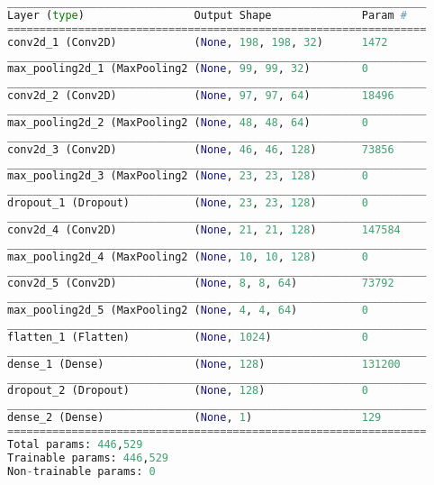 \begin{lstlisting}[language=Python, caption=Full result of the CNN model]
_________________________________________________________________
Layer (type)                 Output Shape              Param #   
=================================================================
conv2d_1 (Conv2D)            (None, 198, 198, 32)      1472      
_________________________________________________________________
max_pooling2d_1 (MaxPooling2 (None, 99, 99, 32)        0         
_________________________________________________________________
conv2d_2 (Conv2D)            (None, 97, 97, 64)        18496     
_________________________________________________________________
max_pooling2d_2 (MaxPooling2 (None, 48, 48, 64)        0         
_________________________________________________________________
conv2d_3 (Conv2D)            (None, 46, 46, 128)       73856     
_________________________________________________________________
max_pooling2d_3 (MaxPooling2 (None, 23, 23, 128)       0         
_________________________________________________________________
dropout_1 (Dropout)          (None, 23, 23, 128)       0         
_________________________________________________________________
conv2d_4 (Conv2D)            (None, 21, 21, 128)       147584    
_________________________________________________________________
max_pooling2d_4 (MaxPooling2 (None, 10, 10, 128)       0         
_________________________________________________________________
conv2d_5 (Conv2D)            (None, 8, 8, 64)          73792     
_________________________________________________________________
max_pooling2d_5 (MaxPooling2 (None, 4, 4, 64)          0         
_________________________________________________________________
flatten_1 (Flatten)          (None, 1024)              0         
_________________________________________________________________
dense_1 (Dense)              (None, 128)               131200    
_________________________________________________________________
dropout_2 (Dropout)          (None, 128)               0         
_________________________________________________________________
dense_2 (Dense)              (None, 1)                 129       
=================================================================
Total params: 446,529
Trainable params: 446,529
Non-trainable params: 0
\end{lstlisting}